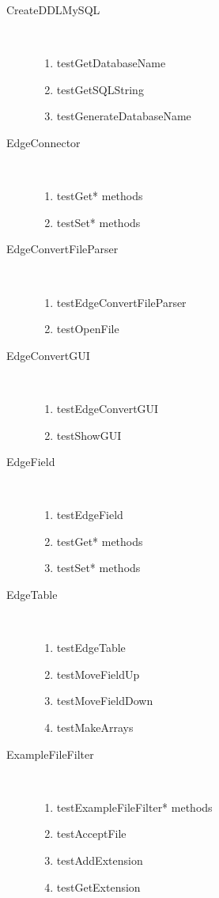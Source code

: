 \documentclass{article}
\begin{document}
\begin{description}
\item[CreateDDLMySQL] \hfill \\
\begin{enumerate}
\item testGetDatabaseName
\item testGetSQLString
\item testGenerateDatabaseName
\end{enumerate}
\item[EdgeConnector] \hfill \\
\begin{enumerate}
\item testGet* methods
\item testSet* methods
\end{enumerate}
\item[EdgeConvertFileParser] \hfill \\
\begin{enumerate}
\item testEdgeConvertFileParser
\item testOpenFile
\end{enumerate}
\item[EdgeConvertGUI] \hfill \\
\begin{enumerate}
\item testEdgeConvertGUI
\item testShowGUI
\end{enumerate}
\item[EdgeField] \hfill \\
\begin{enumerate}
\item testEdgeField
\item testGet* methods
\item testSet* methods
\end{enumerate}
\item[EdgeTable] \hfill \\
\begin{enumerate}
\item testEdgeTable
\item testMoveFieldUp
\item testMoveFieldDown
\item testMakeArrays
\end{enumerate}
\item[ExampleFileFilter] \hfill \\
\begin{enumerate}
\item testExampleFileFilter* methods
\item testAcceptFile
\item testAddExtension
\item testGetExtension
\end{enumerate}
\end{description}
\end{document}
